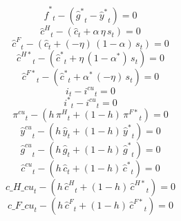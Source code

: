 \begin{dmath}
{{\hat f^*}}_{t}-\left({{\hat g^*}}_{t}-{{\hat y^*}}_{t}\right)=0
\end{dmath}
\begin{dmath}
{{\hat c^H}}_{t}-\left({{\hat c}}_{t}+{{\alpha}}\, {{\eta}}\, {{s}}_{t}\right)=0
\end{dmath}
\begin{dmath}
{{\hat c^F}}_{t}-\left({{\hat c}}_{t}+\left(-{{\eta}}\right)\, \left(1-{{\alpha}}\right)\, {{s}}_{t}\right)=0
\end{dmath}
\begin{dmath}
{{\hat c^{H*}}}_{t}-\left({{\hat c^*}}_{t}+{{\eta}}\, \left(1-{{\alpha^*}}\right)\, {{s}}_{t}\right)=0
\end{dmath}
\begin{dmath}
{{\hat c^{F*}}}_{t}-\left({{\hat c^*}}_{t}+{{\alpha^*}}\, \left(-{{\eta}}\right)\, {{s}}_{t}\right)=0
\end{dmath}
\begin{dmath}
{{i}}_{t}-{{i^{cu}}}_{t}=0
\end{dmath}
\begin{dmath}
{{i^*}}_{t}-{{i^{cu}}}_{t}=0
\end{dmath}
\begin{dmath}
{{\pi^{cu}}}_{t}-\left({{h}}\, {{\pi^H}}_{t}+\left(1-{{h}}\right)\, {{\pi^{F*}}}_{t}\right)=0
\end{dmath}
\begin{dmath}
{{\hat y^{cu}}}_{t}-\left({{h}}\, {{\hat y}}_{t}+\left(1-{{h}}\right)\, {{\hat y^*}}_{t}\right)=0
\end{dmath}
\begin{dmath}
{{\hat g^{cu}}}_{t}-\left({{h}}\, {{\hat g}}_{t}+\left(1-{{h}}\right)\, {{\hat g^*}}_{t}\right)=0
\end{dmath}
\begin{dmath}
{{\hat c^{cu}}}_{t}-\left({{h}}\, {{\hat c}}_{t}+\left(1-{{h}}\right)\, {{\hat c^*}}_{t}\right)=0
\end{dmath}
\begin{dmath}
{c\_H\_cu}_{t}-\left({{h}}\, {{\hat c^H}}_{t}+\left(1-{{h}}\right)\, {{\hat c^{H*}}}_{t}\right)=0
\end{dmath}
\begin{dmath}
{c\_F\_cu}_{t}-\left({{h}}\, {{\hat c^F}}_{t}+\left(1-{{h}}\right)\, {{\hat c^{F*}}}_{t}\right)=0
\end{dmath}
